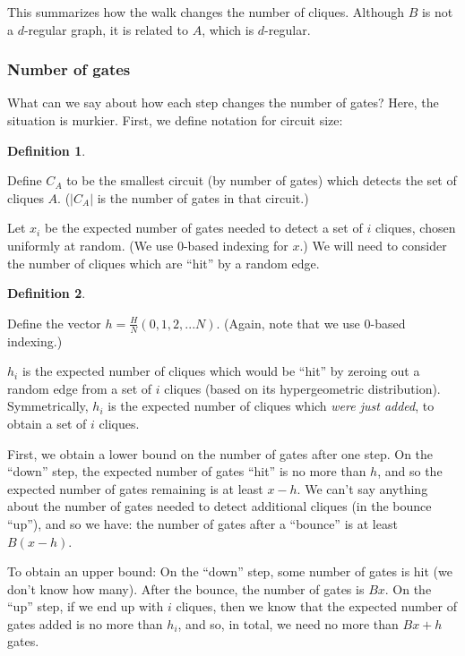 \documentclass[12pt]{article}
\theoremstyle{definition}
\newtheorem{defn}{Definition}[section]
\begin{document}
This summarizes how the walk changes the number of cliques.
Although $B$ is not a $d$-regular graph, it is related to $A$, which is $d$-regular.

\subsubsection{Number of gates}

What can we say about how each step changes the number of gates? Here, the situation is murkier.
First, we define notation for circuit size:

\begin{defn} \label{defn:circuitSize}

Define $C_A$ to be the smallest circuit (by number of gates)
which detects the set of cliques $A$. ($|C_A|$ is the number of gates in that circuit.)

\end{defn}

Let $x_i$ be the expected number of gates needed to detect a set of $i$ cliques, chosen
uniformly at random. (We use 0-based indexing for $x$.)
 We will need to consider the number of cliques which are ``hit'' by
a random edge.

\begin{defn} \label{defn:sequenceVector}

Define the vector $h = \frac{H}{N}(0, 1, 2, ... N)$. (Again, note that we use 0-based indexing.)

$h_i$ is the expected number of cliques which would be ``hit'' by zeroing out a random edge
from a set of $i$ cliques (based on its hypergeometric distribution).
Symmetrically, $h_i$ is the expected number of cliques which {\em were just added}, to obtain a
set of $i$ cliques.

\end{defn}

First, we obtain a lower bound on the number of gates after one step.
On the ``down'' step, the expected number of gates ``hit'' is no more than $h$,
and so the expected number of gates remaining is at least $x - h$.
We can't say anything about the number of gates needed to detect additional cliques (in the bounce ``up''), and so we have:
the number of gates after a ``bounce'' is at least $B(x-h)$.

To obtain an upper bound: On the ``down'' step, some number of gates is hit (we don't know how many).
After the bounce, the number of gates is $Bx$.
On the ``up'' step,
if we end up with $i$ cliques, then we know that the expected number of gates added is no more than $h_i$,
and so, in total, we need no more than $Bx+h$ gates.
\end{document}
